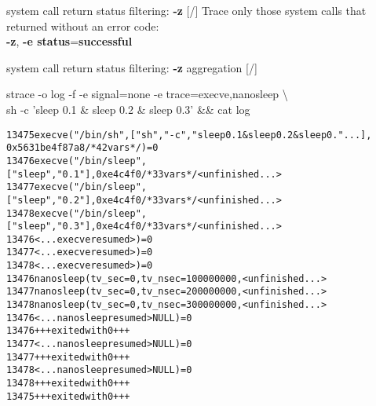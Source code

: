 \documentclass[unicode,aspectratio=169]{beamer}
\begin{document}
\begin{frame}[fragile]{system call return status filtering: \textbf{-z} \hfill [\insertframenumber/\inserttotalframenumber]}
\Large
Trace only those system calls that returned without an error code: \\
\textbf{-z}, \textbf{-e status}=\textbf{successful}
\end{frame}

\begin{frame}[fragile]{system call return status filtering: \textbf{-z} aggregation \hfill [\insertframenumber/\inserttotalframenumber]}
\begin{block}{strace -o log -f -e signal=none -e trace=execve,nanosleep {\textbackslash} \\
	sh -c 'sleep 0.1 \& sleep 0.2 \& sleep 0.3' \&\& cat log}
\scriptsize
\begin{alltt}
13475 execve("/bin/sh", ["sh", "-c", "sleep 0.1 & sleep 0.2 & sleep 0."...],
      0x5631be4f87a8 /* 42 vars */) = 0
13476 execve("/bin/sleep", ["sleep", "0.1"], 0xe4c4f0 /* 33 vars */ <unfinished ...>
13477 execve("/bin/sleep", ["sleep", "0.2"], 0xe4c4f0 /* 33 vars */ <unfinished ...>
13478 execve("/bin/sleep", ["sleep", "0.3"], 0xe4c4f0 /* 33 vars */ <unfinished ...>
13476 <... execve resumed>)             = 0
13477 <... execve resumed>)             = 0
13478 <... execve resumed>)             = 0
13476 nanosleep({tv_sec=0, tv_nsec=100000000},  <unfinished ...>
13477 nanosleep({tv_sec=0, tv_nsec=200000000},  <unfinished ...>
13478 nanosleep({tv_sec=0, tv_nsec=300000000},  <unfinished ...>
13476 <... nanosleep resumed>NULL)      = 0
13476 +++ exited with 0 +++
13477 <... nanosleep resumed>NULL)      = 0
13477 +++ exited with 0 +++
13478 <... nanosleep resumed>NULL)      = 0
13478 +++ exited with 0 +++
13475 +++ exited with 0 +++
\end{alltt}
\end{block}
\end{frame}
\end{document}
